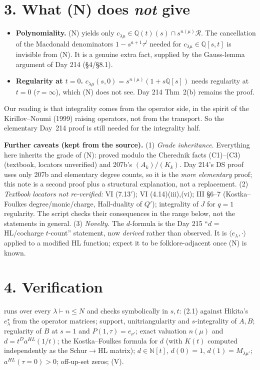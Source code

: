 \documentclass[10pt]{article}
\newcommand{\file}[1]{{\footnotesize\texttt{\detokenize{#1}}}}
\newcommand{\R}{\mathcal{R}}
\begin{document}
\section*{3. What (N) does \emph{not} give}
\begin{itemize}
\item \textbf{Polynomiality.} (N) yields only $c_{\lambda\mu}\in\mathbb Q(t)(s)\cap s^{n(\mu)}\R$. The cancellation of the Macdonald denominators $1-s^{a+1}\tau^l$ needed for $c_{\lambda\mu}\in\mathbb Q[s,t]$ is invisible from (N). It is a genuine extra fact, supplied by the Gauss-lemma argument of Day 214 (\S4/\S8.1).
\item \textbf{Regularity at $t=0$.} $c_{\lambda\mu}(s,0)=s^{n(\mu)}(1+s\mathbb Q[s])$ needs regularity at $t=0$ ($\tau=\infty$), which (N) does not see. Day 214 Thm~2(b) remains the proof.
\end{itemize}
Our reading is that integrality comes from the operator side, in the spirit of the Kirillov--Noumi (1999) raising operators, not from the transport. So the elementary Day~214 proof is still needed for the integrality half.

\medskip
\noindent\textbf{Further caveats (kept from the source).}
(1) \emph{Grade inheritance.} Everything here inherits the grade of (N): proved modulo the Cherednik facts (C1)--(C3) (textbook, locators unverified) and 207b's $(A_k)/(K_k)$. Day 214's DS proof uses only 207b and elementary degree counts, so it is the \emph{more elementary} proof; this note is a second proof plus a structural explanation, not a replacement.
(2) \emph{Textbook locators not re-verified:} VI (7.13$'$); VI (4.14)(iii),(vi); III \S6--7 (Kostka--Foulkes degree/monic/charge, Hall-duality of $Q'$); integrality of $J$ for $q=1$ regularity. The script checks their consequences in the range below, not the statements in general.
(3) \emph{Novelty.} The $d$-formula is the Day 215 ``$d$ = HL/cocharge $t$-count'' statement, now \emph{derived} rather than observed. It is $\langle e_\lambda,\cdot\rangle$ applied to a modified HL function; expect it to be folklore-adjacent once (N) is known.

\section*{4. Verification}
\file{scripts/day218b/ds_from_N.py N} runs over every $\lambda\vdash n\le N$ and checks symbolically in $s,t$: (2.1) against Hikita's $e^\star_\lambda$ from the operator matrices; support, unitriangularity and $s$-integrality of $A,B$; regularity of $B$ at $s=1$ and $P(1,\tau)=e_{\nu'}$; exact valuation $n(\mu)$ and $d=t^Da^{HL}(1/t)$; the Kostka--Foulkes formula for $d$ (with $K(t)$ computed independently as the Schur$\to$HL matrix); $d\in\mathbb N[t]$, $d(0)=1$, $d(1)=M_{\lambda\mu'}$; $a^{HL}(\tau=0)>0$; off-up-set zeros; (V).
\end{document}
